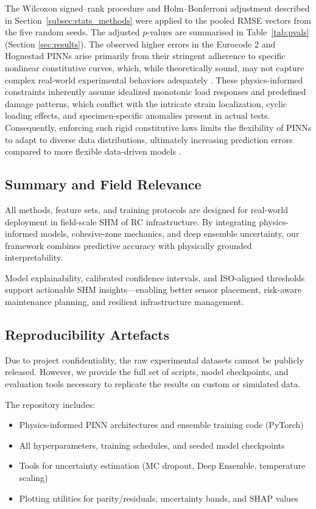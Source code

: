 \documentclass{article}
\begin{document}
The Wilcoxon signed–rank procedure and Holm–Bonferroni adjustment
described in Section~\ref{subsec:stats_methods} were applied to the
pooled RMSE vectors from the five random seeds.
The adjusted $p$-values are summarised in
Table~\ref{tab:pvals} (Section \ref{sec:results}).
The observed higher errors in the Eurocode 2 and Hognestad PINNs arise primarily from their stringent adherence to specific nonlinear constitutive curves, which, while theoretically sound, may not capture complex real-world experimental behaviors adequately \cite{Wang2024DamagePINN, fan2023pinn}. These physics-informed constraints inherently assume idealized monotonic load responses and predefined damage patterns, which conflict with the intricate strain localization, cyclic loading effects, and specimen-specific anomalies present in actual tests. Consequently, enforcing such rigid constitutive laws limits the flexibility of PINNs to adapt to diverse data distributions, ultimately increasing prediction errors compared to more flexible data-driven models \cite{karniadakis2021, Xu2024}.

\subsection{Summary and Field Relevance}

All methods, feature sets, and training protocols are designed for real-world deployment in field-scale SHM of RC infrastructure. By integrating physics-informed models, cohesive-zone mechanics, and deep ensemble uncertainty, our framework combines predictive accuracy with physically grounded interpretability.

Model explainability, calibrated confidence intervals, and ISO-aligned thresholds support actionable SHM insights—enabling better sensor placement, risk-aware maintenance planning, and resilient infrastructure management.

\subsection{Reproducibility Artefacts}
\label{sec:repro}

Due to project confidentiality, the raw experimental datasets cannot be publicly released. However, we provide the full set of scripts, model checkpoints, and evaluation tools necessary to replicate the results on custom or simulated data.

The repository includes:
\begin{itemize}
    \item Physics-informed PINN architectures and ensemble training code (PyTorch)
    \item All hyperparameters, training schedules, and seeded model checkpoints
    \item Tools for uncertainty estimation (MC dropout, Deep Ensemble, temperature scaling)
    \item Plotting utilities for parity/residuals, uncertainty bands, and SHAP values
\end{itemize}
\end{document}
